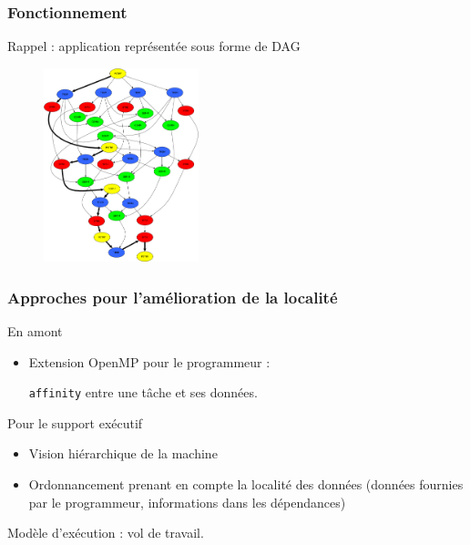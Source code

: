 \documentclass[xcolor={usenames,dvipsnames,svgnames,table}, aspectratio=43]{beamer}
\begin{document}
\begin{frame}
\frametitle{Fonctionnement}

Rappel : application représentée sous forme de DAG

\begin{figure}
  \includegraphics[width=0.4\textwidth]{graph/cholesky-dag-5.pdf}
\end{figure}

\end{frame}



\begin{frame}[fragile]
\frametitle{Approches pour l'amélioration de la localité}

  \begin{block}{En amont}
    \begin{itemize}
      \item Extension OpenMP pour le programmeur :

        \verb/affinity/ entre une tâche et ses données.
    \end{itemize}
  \end{block}

  \begin{block}{Pour le support exécutif}
    \begin{itemize}
      \item Vision hiérarchique de la machine
      \item Ordonnancement prenant en compte la localité des données (données fournies par le programmeur, informations dans les dépendances)
    \end{itemize}
    Modèle d'exécution : vol de travail.
  \end{block}

\end{frame}
\end{document}

